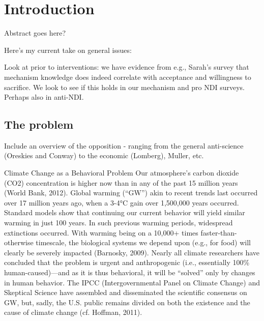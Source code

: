 \chapter{Introduction} \label{c.intro}


Abstract goes here?

Here's my current take on general issues:

Look at prior to interventions: we have evidence from e.g., Sarah's survey that
mechanism knowledge does indeed correlate with acceptance and willingness to
sacrifice. We look to see if this holds in our mechanism and pro NDI surveys.
Perhaps also in anti-NDI.


\section{The problem}

Include an overview of the opposition - ranging from the general anti-science
(Oreskies and Conway) to the economic (Lomberg), Muller, etc.


Climate Change as a Behavioral Problem Our atmosphere's carbon dioxide (CO2)
concentration is higher now than in any of the past 15 million years (World
Bank, 2012). Global warming (``GW'') akin to recent trends last occurred over 17
million years ago, when a 3-4°C gain over 1,500,000 years occurred. Standard
models show that continuing our current behavior will yield similar warming in
just 100 years. In such previous warming periods, widespread extinctions
occurred. With warming being on a 10,000+ times faster-than-otherwise timescale,
the biological systems we depend upon (e.g., for food) will clearly be severely
impacted (Barnosky, 2009). Nearly all climate researchers have concluded that
the problem is urgent and anthropogenic (i.e., essentially 100\%
human-caused)---and as it is thus behavioral, it will be ``solved'' only by
changes in human behavior. The IPCC (Intergovernmental Panel on Climate Change)
and Skeptical Science have assembled and disseminated the scientific consensus
on GW, but, sadly, the U.S. public remains divided on both the existence and the
cause of climate change (cf. Hoffman, 2011).

